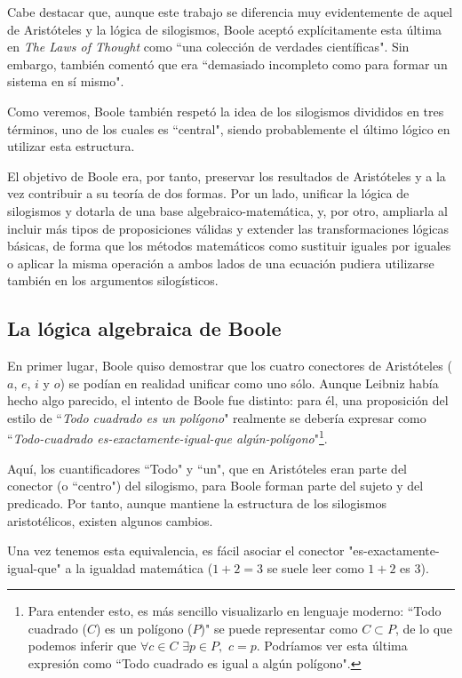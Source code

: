 \documentclass{article}
\begin{document}
Cabe destacar que, aunque este trabajo se diferencia muy evidentemente de aquel de Aristóteles y la lógica de silogismos, Boole aceptó explícitamente esta última en \textit{The Laws of Thought} como ``una colección de verdades científicas". Sin embargo, también comentó que era ``demasiado incompleto como para formar un sistema en sí mismo".

Como veremos, Boole también respetó la idea de los silogismos divididos en tres términos, uno de los cuales es ``central", siendo probablemente el último lógico en utilizar esta estructura.

El objetivo de Boole era, por tanto, preservar los resultados de Aristóteles y a la vez contribuir a su teoría de dos formas. Por un lado, unificar la lógica de silogismos y dotarla de una base algebraico-matemática, y, por otro, ampliarla al incluir más tipos de proposiciones válidas y extender las transformaciones lógicas básicas, de forma que los métodos matemáticos como sustituir iguales por iguales o aplicar la misma operación a ambos lados de una ecuación pudiera utilizarse también en los argumentos silogísticos\cite{boole2003laws}.

\subsection{La lógica algebraica de Boole}

En primer lugar, Boole quiso demostrar que los cuatro conectores de Aristóteles ($a$, $e$, $i$ y $o$) se podían en realidad unificar como uno sólo. Aunque Leibniz había hecho algo parecido, el intento de Boole fue distinto: para él, una proposición del estilo de ``\textit{Todo cuadrado es un polígono}" realmente se debería expresar como ``\textit{Todo-cuadrado es-exactamente-igual-que algún-polígono}"\footnote{Para entender esto, es más sencillo visualizarlo en lenguaje moderno: ``Todo cuadrado ($C$) es un polígono ($P$)" se puede representar como $C \subset P$, de lo que podemos inferir que $\forall c \in C \,\, \exists p \in P, \,\, c = p$. Podríamos ver esta última expresión como ``Todo cuadrado es igual a algún polígono".}.

Aquí, los cuantificadores ``Todo" y ``un", que en Aristóteles eran parte del conector (o ``centro") del silogismo, para Boole forman parte del sujeto y del predicado. Por tanto, aunque mantiene la estructura de los silogismos aristotélicos, existen algunos cambios.

Una vez tenemos esta equivalencia, es fácil asociar el conector "es-exactamente-igual-que" a la igualdad matemática ($1+2=3$ se suele leer como $1+2$ es $3$).
\end{document}
